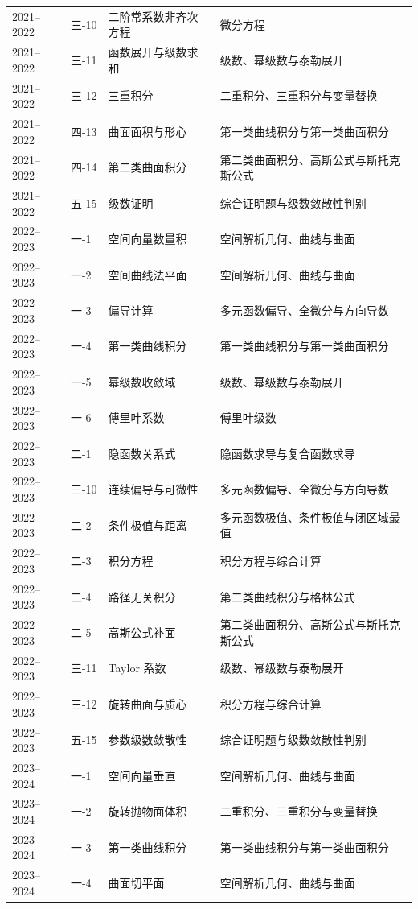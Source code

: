 ﻿\documentclass[11pt,a4paper,UTF8]{ctexart}
\begin{document}
\begin{longtable}{p{2.0cm}p{1.8cm}p{4.2cm}p{6.2cm}}
2021--2022 & 三-10 & 二阶常系数非齐次方程 & 微分方程\\
2021--2022 & 三-11 & 函数展开与级数求和 & 级数、幂级数与泰勒展开\\
2021--2022 & 三-12 & 三重积分 & 二重积分、三重积分与变量替换\\
2021--2022 & 四-13 & 曲面面积与形心 & 第一类曲线积分与第一类曲面积分\\
2021--2022 & 四-14 & 第二类曲面积分 & 第二类曲面积分、高斯公式与斯托克斯公式\\
2021--2022 & 五-15 & 级数证明 & 综合证明题与级数敛散性判别\\
2022--2023 & 一-1 & 空间向量数量积 & 空间解析几何、曲线与曲面\\
2022--2023 & 一-2 & 空间曲线法平面 & 空间解析几何、曲线与曲面\\
2022--2023 & 一-3 & 偏导计算 & 多元函数偏导、全微分与方向导数\\
2022--2023 & 一-4 & 第一类曲线积分 & 第一类曲线积分与第一类曲面积分\\
2022--2023 & 一-5 & 幂级数收敛域 & 级数、幂级数与泰勒展开\\
2022--2023 & 一-6 & 傅里叶系数 & 傅里叶级数\\
2022--2023 & 二-1 & 隐函数关系式 & 隐函数求导与复合函数求导\\
2022--2023 & 三-10 & 连续偏导与可微性 & 多元函数偏导、全微分与方向导数\\
2022--2023 & 二-2 & 条件极值与距离 & 多元函数极值、条件极值与闭区域最值\\
2022--2023 & 二-3 & 积分方程 & 积分方程与综合计算\\
2022--2023 & 二-4 & 路径无关积分 & 第二类曲线积分与格林公式\\
2022--2023 & 二-5 & 高斯公式补面 & 第二类曲面积分、高斯公式与斯托克斯公式\\
2022--2023 & 三-11 & Taylor 系数 & 级数、幂级数与泰勒展开\\
2022--2023 & 三-12 & 旋转曲面与质心 & 积分方程与综合计算\\
2022--2023 & 五-15 & 参数级数敛散性 & 综合证明题与级数敛散性判别\\
2023--2024 & 一-1 & 空间向量垂直 & 空间解析几何、曲线与曲面\\
2023--2024 & 一-2 & 旋转抛物面体积 & 二重积分、三重积分与变量替换\\
2023--2024 & 一-3 & 第一类曲线积分 & 第一类曲线积分与第一类曲面积分\\
2023--2024 & 一-4 & 曲面切平面 & 空间解析几何、曲线与曲面\\

\end{longtable}
\end{document}
